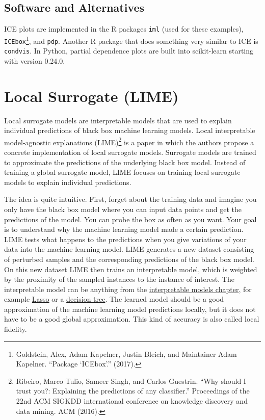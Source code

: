\documentclass[
  10pt,
]{scrbook}
\begin{document}
\hypertarget{software-and-alternatives-2}{%
\subsection{Software and Alternatives}\label{software-and-alternatives-2}}

ICE plots are implemented in the R packages \texttt{iml} (used for these examples), \texttt{ICEbox}\footnote{Goldstein, Alex, Adam Kapelner, Justin Bleich, and Maintainer Adam Kapelner. ``Package `ICEbox'.'' (2017).}, and \texttt{pdp}.
Another R package that does something very similar to ICE is \texttt{condvis}. In Python, partial dependence plots are built into scikit-learn starting with version 0.24.0.

\newpage

\hypertarget{lime}{%
\section{Local Surrogate (LIME)}\label{lime}}

Local surrogate models are interpretable models that are used to explain individual predictions of black box machine learning models.
Local interpretable model-agnostic explanations (LIME)\footnote{Ribeiro, Marco Tulio, Sameer Singh, and Carlos Guestrin. ``Why should I trust you?: Explaining the predictions of any classifier.'' Proceedings of the 22nd ACM SIGKDD international conference on knowledge discovery and data mining. ACM (2016).} is a paper in which the authors propose a concrete implementation of local surrogate models.
Surrogate models are trained to approximate the predictions of the underlying black box model.
Instead of training a global surrogate model, LIME focuses on training local surrogate models to explain individual predictions.

The idea is quite intuitive.
First, forget about the training data and imagine you only have the black box model where you can input data points and get the predictions of the model.
You can probe the box as often as you want.
Your goal is to understand why the machine learning model made a certain prediction.
LIME tests what happens to the predictions when you give variations of your data into the machine learning model.
LIME generates a new dataset consisting of perturbed samples and the corresponding predictions of the black box model.
On this new dataset LIME then trains an interpretable model, which is weighted by the proximity of the sampled instances to the instance of interest.
The interpretable model can be anything from the \protect\hyperlink{simple}{interpretable models chapter}, for example \protect\hyperlink{lasso}{Lasso} or a \protect\hyperlink{tree}{decision tree}.
The learned model should be a good approximation of the machine learning model predictions locally, but it does not have to be a good global approximation.
This kind of accuracy is also called local fidelity.
\end{document}
